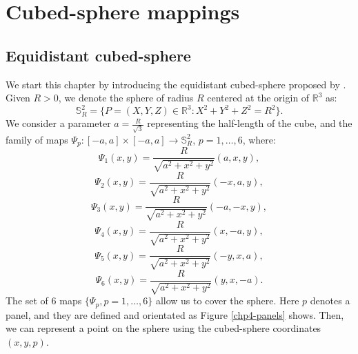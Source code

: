 \section{Cubed-sphere mappings}
\label{cs-mappings}
\subsection{Equidistant cubed-sphere}
\label{equidistant-cs}
We start this chapter by introducing the equidistant cubed-sphere proposed by 
\citet{sadourny:1972}. Given $R>0$, we denote the sphere of radius $R$ 
centered at the origin of  $\mathbb{R}^3$ as:
\begin{equation*}
	\mathbb{S}^2_R = \{ P = (X,Y,Z) \in \mathbb{R}^3: X^2 + Y^2 + Z^2 = R^2\}.
\end{equation*}
We consider a parameter $a = \frac{R}{\sqrt{3}}$ representing the half-length of 
the cube, and the family of maps
$\Psi_{p}: [-a,a] \times [-a,a] \to \mathbb{S}^2_R$, $p=1, \ldots, 6$,
where:
\begin{equation*}
	\Psi_{1}(x,y) = \frac{R}{\sqrt{a^2 + x^2 + y^2}}(a, x, y), 
\end{equation*}
\begin{equation*}
	\Psi_{2}(x,y) = \frac{R}{\sqrt{a^2 + x^2 + y^2}}(-x, a, y), 
\end{equation*}
\begin{equation*}
	\Psi_{3}(x,y) = \frac{R}{\sqrt{a^2 + x^2 + y^2}}(-a, -x, y), 
\end{equation*}
\begin{equation*}
	\Psi_{4}(x,y) = \frac{R}{\sqrt{a^2 + x^2 + y^2}}(x, -a, y), 
\end{equation*}
\begin{equation*}
	\Psi_{5}(x,y) = \frac{R}{\sqrt{a^2 + x^2 + y^2}}(-y, x, a), 
\end{equation*}
\begin{equation*}
	\Psi_{6}(x,y) = \frac{R}{\sqrt{a^2 + x^2 + y^2}}(y, x, -a).
\end{equation*}
The set of 6 maps $\{\Psi_{p}, p = 1, \ldots, 6\}$ allow us to cover the sphere.
Here $p$ denotes a panel, and they are defined and orientated as Figure \ref{chp4-panels}
shows. Then, we can represent a point on the sphere using the cubed-sphere coordinates
$(x,y,p)$.

